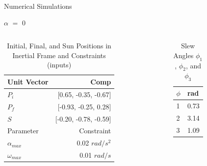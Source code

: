 \documentclass{beamer}
\begin{document}
\begin{frame}{Numerical Simulations}
	\begin{block}{$\alpha$ $=$ 0}

\begin{columns}
	\begin{column}{0.7\textwidth}
		\begin{center}
			\begin{table}[H]
				\centering
				\caption{Initial, Final, and Sun Positions in Inertial Frame and Constraints (inputs)}
				\begin{tabular}{lr}
					\toprule
					\midrule
					Unit Vector & Comp \\
					\midrule
					$P_i$ & [0.65, -0.35, -0.67] \\
					$P_f$ & [-0.93, -0.25, 0.28] \\ 
					$S$ & [-0.20, -0.78, -0.59] \\
					\midrule
					\midrule
					Parameter & Constraint \\ 
					\midrule
					$\alpha_{max}$ & 0.02 $rad/s^2$ \\
					$\omega_{max}$ & 0.01 $rad/s$ \\ 
					\midrule
					\bottomrule
				\end{tabular}%
				\label{tab:Pi_Pf_S}%
			\end{table}
		\end{center}
	\end{column}
	\begin{column}{0.3\textwidth}
		\begin{center}
			\begin{table}[H]
				\centering
				\caption{Slew Angles $\phi_1$, $\phi_2$, and $\phi_3$}
				\begin{tabular}{ll}
					\toprule
					\midrule
					$\phi$ & rad \\
					\midrule
					1 & 0.73 \\
					2 & 3.14 \\ 
					3 & 1.09 \\
					\midrule
					\bottomrule
				\end{tabular}%
				\label{tab:phi_123}%
			\end{table}%
		\end{center}
	\end{column}
\end{columns}

\end{block}
\end{frame}
\end{document}
